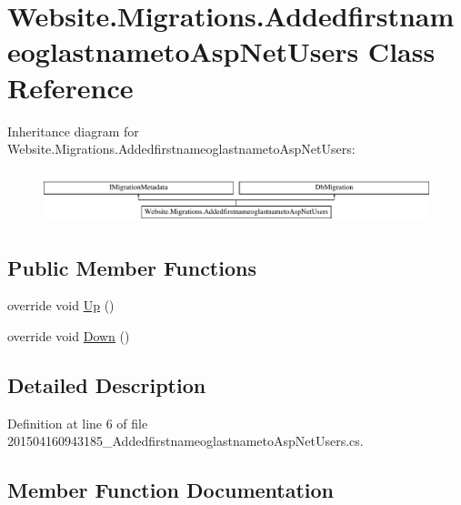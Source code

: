 \hypertarget{class_website_1_1_migrations_1_1_addedfirstnameoglastnameto_asp_net_users}{}\section{Website.\+Migrations.\+Addedfirstnameoglastnameto\+Asp\+Net\+Users Class Reference}
\label{class_website_1_1_migrations_1_1_addedfirstnameoglastnameto_asp_net_users}
Inheritance diagram for Website.\+Migrations.\+Addedfirstnameoglastnameto\+Asp\+Net\+Users\+:\begin{figure}[H]
\begin{center}
\leavevmode
\includegraphics[height=1.534247cm]{class_website_1_1_migrations_1_1_addedfirstnameoglastnameto_asp_net_users}
\end{center}
\end{figure}
\subsection*{Public Member Functions}
\begin{DoxyCompactItemize}
\item 
override void \hyperlink{class_website_1_1_migrations_1_1_addedfirstnameoglastnameto_asp_net_users_ac8c689f7cb0b6b04b80479b7a144bbc5}{Up} ()
\item 
override void \hyperlink{class_website_1_1_migrations_1_1_addedfirstnameoglastnameto_asp_net_users_aebe6855eecb0a5c0f5107fe28b6ad38e}{Down} ()
\end{DoxyCompactItemize}


\subsection{Detailed Description}


Definition at line 6 of file 201504160943185\+\_\+\+Addedfirstnameoglastnameto\+Asp\+Net\+Users.\+cs.



\subsection{Member Function Documentation}
\hypertarget{class_website_1_1_migrations_1_1_addedfirstnameoglastnameto_asp_net_users_aebe6855eecb0a5c0f5107fe28b6ad38e}{}
